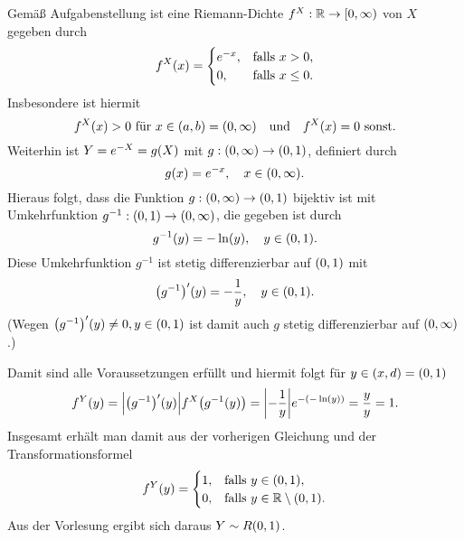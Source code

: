 \documentclass{exercise}
\begin{document}
    Gemäß Aufgabenstellung ist eine Riemann-Dichte \(f^X: \R \to \left[0, \infty\right)\) von \(X\) gegeben durch
    \[
        f^X\parentheses*{x} = \begin{cases}
            e^{-x}, & \text{falls }x > 0,\\
            0, & \text{falls }x \le 0.
        \end{cases}
    \]
    Insbesondere ist hiermit
    \[
        f^X\parentheses*{x} > 0\text{ für }x \in \parentheses*{a, b} = \parentheses*{0, \infty} \quad \text{und} \quad f^X\parentheses*{x} = 0\text{ sonst}.
    \]
    Weiterhin ist \(Y = e^{-X} = g\parentheses*{X}\) mit \(g: \parentheses*{0, \infty} \to \parentheses*{0, 1}\), definiert durch
    \[
        g\parentheses*{x} = e^{-x}, \quad x \in \parentheses*{0, \infty}.
    \]
    Hieraus folgt, dass die Funktion \(g: \parentheses*{0, \infty} \to \parentheses*{0, 1}\) bijektiv ist mit Umkehrfunktion \(g^{-1}: \parentheses*{0, 1} \to \parentheses*{0, \infty}\), die gegeben ist durch
    \[
        g^{-1}\parentheses*{y} = -\ln\parentheses*{y}, \quad y \in \parentheses*{0, 1}.
    \]
    Diese Umkehrfunktion \(g^{-1}\) ist stetig differenzierbar auf \(\parentheses*{0, 1}\) mit
    \[
        \parentheses*{g^{-1}}'\parentheses*{y} = -\frac{1}{y}, \quad y \in \parentheses*{0, 1}.
    \]
    (Wegen \(\parentheses*{g^{-1}}'\parentheses*{y} \ne 0, y \in \parentheses*{0, 1}\) ist damit auch \(g\) stetig differenzierbar auf \(\parentheses*{0, \infty}\).)

    Damit sind alle Voraussetzungen erfüllt und hiermit folgt für \(y \in \parentheses*{x, d} = \parentheses*{0, 1}\)
    \[
        f^Y\parentheses*{y} = \absolute*{\parentheses*{g^{-1}}'\parentheses*{y}}f^X\parentheses*{g^{-1}\parentheses*{y}} = \absolute*{-\frac{1}{y}}e^{-\parentheses*{-\ln\parentheses*{y}}} = \frac{y}{y} = 1.
    \]
    Insgesamt erhält man damit aus der vorherigen Gleichung und der Transformationsformel
    \[
        f^Y\parentheses*{y} = \begin{cases}
            1, & \text{falls }y \in \parentheses*{0, 1},\\
            0, & \text{falls }y \in \R \setminus \parentheses*{0, 1}.
        \end{cases}
    \]
    Aus der Vorlesung ergibt sich daraus \(Y \sim R\parentheses*{0, 1}\).
\end{document}
